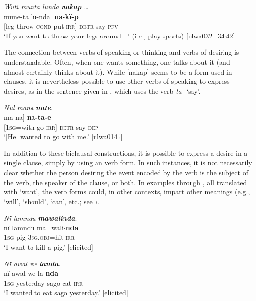 \ea%
    \label{ex:syntax:385}
          \textit{Wutï munta lunda} \textbf{\textit{nakap}} \textit{…}\\
\gll    {[wutï}  mune-ta    {lu-nda]}    \textbf{na-kï-p}\\
    {[leg}  throw-\textsc{cond}  put-\textsc{irr]}  \textsc{detr}{}-say-\textsc{pfv}\\
\glt `If you want to throw your legs around …’ (i.e., play sports) [ulwa032\_34:42]
\z

  The  connection between verbs of speaking or thinking and verbs of desiring is understandable. Often, when one wants something, one talks about it (and almost certainly thinks about it). While [nakap] seems to be a  form used in  clauses, it is nevertheless possible to use other verbs of speaking to express desires, as in the  sentence given in , which uses the verb \textit{ta-} ‘say’.

\newpage

\ea%
    \label{ex:syntax:386}
          \textit{Nul mana} \textbf{\textit{nate}}.\\
\gll {[nï=ul}  {ma-na]}      \textbf{na-ta-e}\\
    {[1\textsc{sg}=with}   go-\textsc{irr]}  \textsc{detr-}say-\textsc{dep}\\
\glt `[He] wanted to go with me.’ [ulwa014†]
\z

In addition to these  biclausal  constructions, it is possible to express a desire in a single clause, simply by using an  verb form. In such instances, it is not necessarily clear whether the person desiring the event encoded by the verb is the subject of the verb, the speaker of the clause, or both. In examples  through , all translated with ‘want’, the  verb forms could, in other contexts, impart other meanings (e.g., ‘will’, ‘should’, ‘can’, etc.; see ).

\ea%
    \label{ex:syntax:387}
          \textit{Nï lamndu} \textbf{\textit{mawalinda}}.\\
\gll nï    lamndu  ma=wali-\textbf{nda}\\
    1\textsc{sg}  pig      3\textsc{sg.obj}=hit-\textsc{irr}\\
\glt `I want to kill a pig.’ [elicited]
\z


\ea%
    \label{ex:syntax:388}
          \textit{Nï awal we} \textbf{\textit{landa}}.\\
\gll nï    awal    we    la-\textbf{nda}\\
    1\textsc{sg}  yesterday  sago  eat-\textsc{irr}\\
\glt `I wanted to eat sago yesterday.’ [elicited]
\z

